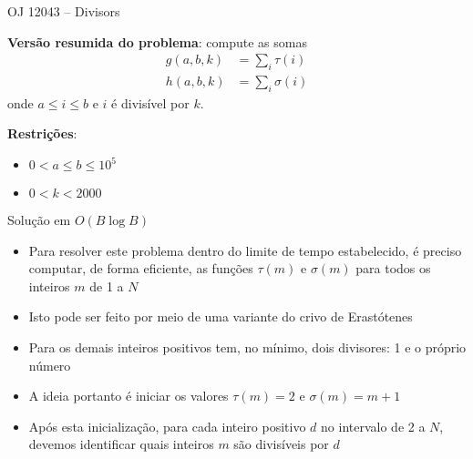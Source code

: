 \begin{frame}[fragile]{OJ 12043 -- Divisors}

    \textbf{Versão resumida do problema}: compute as somas
    \begin{align*}
        g(a, b, k) &= \sum_i \tau(i) \\
        h(a, b, k) &= \sum_i \sigma(i)
    \end{align*}
    onde $a\leq i\leq b$ e $i$ é divisível por $k$.

    \vspace{0.1in}

    \textbf{Restrições}:
    \begin{itemize}
        \item $0 < a \leq b\leq 10^5$
        \item $0 < k < 2000$
    \end{itemize}
\end{frame}

\begin{frame}[fragile]{Solução em $O(B\log B)$}

    \begin{itemize}
        \item Para resolver este problema dentro do limite de tempo estabelecido, é preciso
            computar, de forma eficiente, as funções $\tau(m)$ e $\sigma(m)$ para todos 
            os inteiros $m$ de 1 a $N$

        \item Isto pode ser feito por meio de uma variante do crivo de Erastótenes

        \item Para os demais inteiros positivos tem, no mínimo, dois divisores: 1 e o próprio
            número

        \item A ideia portanto é iniciar os valores $\tau(m) = 2$ e $\sigma(m) = m + 1$

        \item Após esta inicialização, para cada inteiro positivo $d$ no intervalo de 2 a $N$,
            devemos identificar quais inteiros $m$ são divisíveis por $d$
    \end{itemize}

\end{frame}

